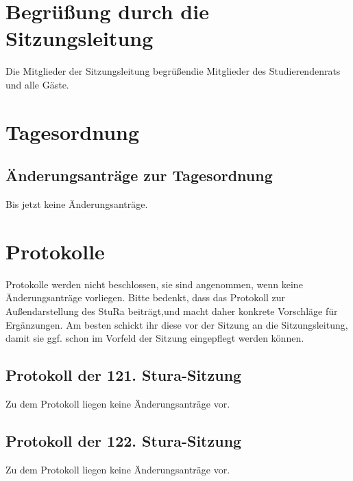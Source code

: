 \section{Begrüßung durch die Sitzungsleitung}
Die Mitglieder  der  Sitzungsleitung begrüßendie  Mitglieder  des  Studierendenrats  und  alle Gäste.

\section{Tagesordnung}
\tableofcontents
\subsection{Änderungsanträge zur Tagesordnung}
Bis jetzt keine Änderungsanträge.
\section{Protokolle}
Protokolle werden nicht beschlossen, sie sind angenommen, wenn keine Änderungsanträge vorliegen.
Bitte bedenkt, dass das Protokoll zur Außendarstellung des StuRa beiträgt,und macht daher konkrete Vorschläge
für Ergänzungen. Am besten schickt ihr diese vor der Sitzung an die Sitzungsleitung, damit sie ggf. schon im 
Vorfeld der Sitzung eingepflegt werden können.
\subsection{Protokoll der 121. Stura-Sitzung}
Zu dem Protokoll liegen keine Änderungsanträge vor.
\subsection{Protokoll der 122. Stura-Sitzung}
Zu dem Protokoll liegen keine Änderungsanträge vor.